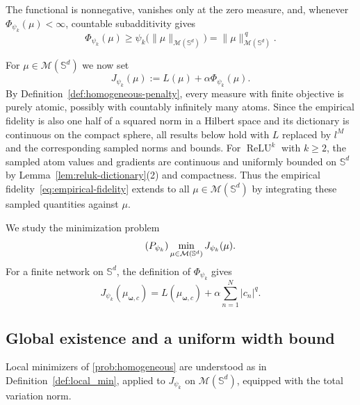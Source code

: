 \documentclass[11pt]{amsart}
\theoremstyle{definition}
\theoremstyle{remark}
\DeclareMathOperator{\relu}{ReLU}
\newcommand{\reluk}{\relu^{k}}
\begin{document}
The functional is nonnegative, vanishes only at the zero measure, and, whenever
$\Phi_{\psi_k}(\mu)<\infty$, countable subadditivity gives
\begin{equation}
\label{eq:homogeneous-penalty-tv-bound}
	\Phi_{\psi_k}(\mu)
	\ge\psi_k\bigl(\|\mu\|_{\mathcal M(\mathbb S^d)}\bigr)
	=\|\mu\|_{\mathcal M(\mathbb S^d)}^{\,q}.
\end{equation}




For $\mu\in\mathcal M(\mathbb S^d)$ we now set
\begin{equation*}
	J_{\psi_k}(\mu)
	:=L(\mu)+\alpha\Phi_{\psi_k}(\mu).
\end{equation*}
By Definition~\ref{def:homogeneous-penalty}, every measure with finite
objective is purely atomic, possibly with countably infinitely many atoms.
Since the empirical fidelity is also one half of a squared norm in a Hilbert
space and
its dictionary is continuous on the compact sphere, all results below hold
with $L$ replaced by $l^M$ and the corresponding sampled norms and bounds.
For $\reluk$ with $k\ge2$, the sampled atom values and gradients are
continuous and uniformly bounded on $\mathbb S^d$ by
Lemma~\ref{lem:reluk-dictionary}(2) and compactness.
Thus the empirical fidelity~\eqref{eq:empirical-fidelity} extends to all
$\mu\in\mathcal M(\mathbb S^d)$ by integrating these sampled quantities
against $\mu$.

We study the minimization problem
\begin{equation*}
\tag{$P_{\psi_k}$}
\label{prob:homogeneous}
	\min_{\mu\in\mathcal M(\mathbb S^d)}J_{\psi_k}(\mu).
\end{equation*}
For a finite network on $\mathbb S^d$, the definition of $\Phi_{\psi_k}$ gives
\begin{equation*}
	J_{\psi_k}(\mu_{\boldsymbol\omega,c})
	=L(\mu_{\boldsymbol\omega,c})+\alpha\sum_{n=1}^N|c_n|^q.
\end{equation*}



\subsection{Global existence and a uniform width bound}
Local minimizers of \eqref{prob:homogeneous} are understood as in
Definition~\ref{def:local_min}, applied to $J_{\psi_k}$ on
$\mathcal M(\mathbb S^d)$, equipped with the total variation norm.
\end{document}
